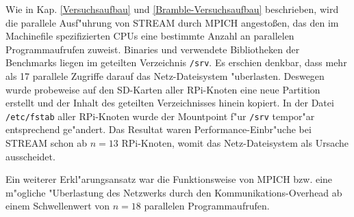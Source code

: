 \begin{enumerate}
Wie in Kap. \ref{Versuchsaufbau} und \ref{Bramble-Versuchsaufbau} beschrieben, wird die parallele Ausf"uhrung von STREAM durch MPICH angesto\ss en, das den im Machinefile spezifizierten CPUs eine bestimmte Anzahl an parallelen Programmaufrufen zuweist. Binaries und verwendete Bibliotheken der Benchmarks liegen im geteilten Verzeichnis \texttt{/srv}. Es erschien denkbar, dass mehr als 17 parallele Zugriffe darauf das Netz-Dateisystem "uberlasten. Deswegen wurde probeweise auf den SD-Karten aller RPi-Knoten eine neue Partition erstellt und der Inhalt des geteilten Verzeichnisses hinein kopiert. In der Datei \texttt{/etc/fstab} aller RPi-Knoten wurde der Mountpoint f"ur \texttt{/srv} tempor"ar entsprechend ge"andert. Das Resultat waren Performance-Einbr"uche bei STREAM schon ab $n=13$ RPi-Knoten, womit das Netz-Dateisystem als Ursache ausscheidet.  

Ein weiterer Erkl"arungsansatz war die Funktionsweise von MPICH bzw. eine m"ogliche "Uberlastung des Netzwerks durch den Kommunikations-Overhead ab einem Schwellenwert von $n=18$ parallelen Programmaufrufen. 


\end{enumerate}
